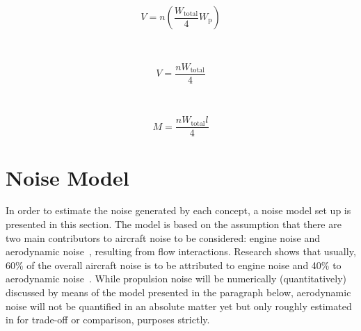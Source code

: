 \begin{minipage}{.3\textwidth}
    \begin{equation}
    \label{eq:engine_load1}
    V = n\left(\frac{W_{\text{total}}}{4}W_{\text{p}}\right)
    \end{equation}
\end{minipage}
~
\begin{minipage}{0.3\textwidth}
    \begin{equation}
    \label{eq:engine_load2_shear}
        V = \frac{nW_{\text{total}}}{4}
    \end{equation}
\end{minipage}
~
\begin{minipage}{0.3\textwidth}
    \begin{equation}
    \label{eq:engine_load2_moment}
    M = \frac{nW_{\text{total}}l}{4}
    \end{equation}
\end{minipage}




\section{Noise Model}\label{sec:noise_model}
In order to estimate the noise generated by each concept, a noise model set up is presented in this section.
The model is based on the assumption that there are two main contributors to aircraft noise to be considered: engine noise and aerodynamic noise~\cite{aerodynamicKoutsoukos}, resulting from flow interactions.
Research shows that usually, 60\% of the overall aircraft noise is to be attributed to engine noise and 40\% to aerodynamic noise~\cite{noisepercentages}.
While propulsion noise will be numerically (quantitatively) discussed by means of the model presented in the paragraph below, aerodynamic noise will not be quantified in an absolute matter yet but only roughly estimated in  for trade-off or comparison, purposes strictly.

